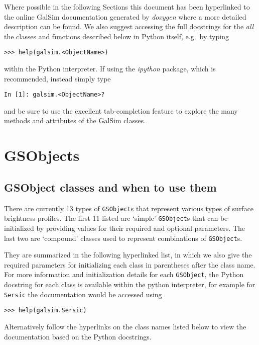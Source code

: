 \documentclass[preprint,11pt]{aastex}
\begin{document}
Where possible in the following Sections this document has been hyperlinked to the online
GalSim documentation generated by \emph{doxygen} where a more detailed
description can be found.  We also suggest accessing the full docstrings for the \emph{all} the
classes and functions described below in Python itself, e.g.\ by typing

{\tt >>> help(galsim.<ObjectName>)}

within the Python interpreter.  If using the \emph{ipython} package,
which is recommended, instead simply type

{\tt In [1]: galsim.<ObjectName>?}

and be sure to use the excellent tab-completion feature to explore the many
methods and attributes of the GalSim classes.

\newpage

\section{GSObjects}\label{sect:gsobjects}

\subsection{GSObject classes and when to use them}\label{sect:gsobjectclasses}
There are currently 13 types of \texttt{GSObject}s that represent various types of surface brightness
profiles. The first 11 listed are 
`simple' \texttt{GSObject}s that can be initialized by providing values for
their required and optional parameters.  The last two are `compound'
classes used to represent combinations of \texttt{GSObject}s.  

They are summarized in the following hyperlinked list, in which we also give
the required parameters for initializing each class in parentheses
after the class name.  For more information and initialization details for each \texttt{GSObject},
the Python docstring for each class is available within the python interpreter, for example for
\texttt{Sersic} the documentation would be accessed using 

{\tt >>> help(galsim.Sersic)}

Alternatively follow the hyperlinks on
the class names listed below to view the documentation based
on the Python docstrings.
\end{document}

